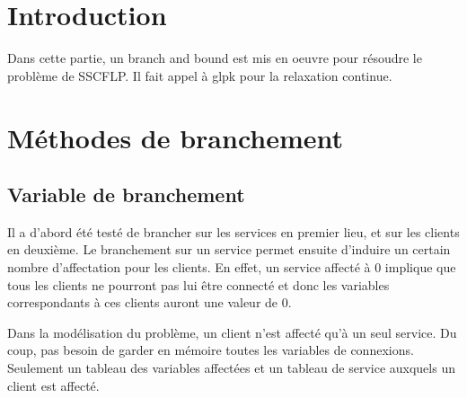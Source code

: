 \section{Introduction}

Dans cette partie, un branch and bound est mis en oeuvre pour résoudre le problème de SSCFLP.
Il fait appel à glpk pour la relaxation continue.

\section{Méthodes de branchement}

\subsection{Variable de branchement}

Il a d'abord été testé de brancher sur les services en premier lieu, et sur les clients en deuxième.
Le branchement sur un service permet ensuite d'induire un certain nombre d'affectation pour les clients.
En effet, un service affecté à 0 implique que tous les clients ne pourront pas lui être connecté et donc les variables correspondants à ces clients auront une valeur de 0. \newline

Dans la modélisation du problème, un client n'est affecté qu'à un seul service. Du coup, pas besoin de garder en mémoire toutes les variables de connexions.
Seulement un tableau des variables affectées et un tableau de service auxquels un client est affecté.
